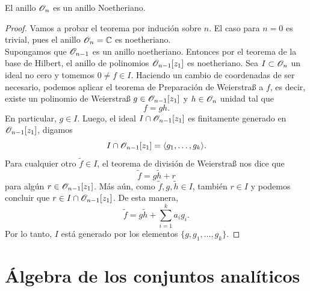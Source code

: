\begin{theorem}\label{anillonoetheriano}
	El anillo $\mathscr{O}_{n}$ es un anillo Noetheriano.
\end{theorem}
\begin{proof}
	Vamos a probar el teorema por indución sobre $n$. El caso para $n=0$ es trivial, pues el anillo $\mathscr{O}_n=\mathbb{C}$ es noetheriano.\\
	Supongamos que $\mathscr{O}_{n-1}$ es un anillo noetheriano. Entonces por el teorema de la base de Hilbert, el anillo de polinomios $\mathscr{O}_{n-1}[z_1]$ es noetheriano. Sea $I\subset\mathscr{O}_n$ un ideal no cero y tomemos $0\neq f\in I$. Haciendo un cambio de coordenadas de ser necesario, podemos aplicar el teorema de Preparación de Weierstraß a $f$, es decir, existe un polinomio de Weierstraß $g\in \mathscr{O}_{n-1}[z_1]$ y $h\in\mathscr{O}_n$ unidad tal que
	\begin{equation*}
		f=gh.
	\end{equation*}
	En particular, $g\in I$. Luego, el ideal $I\cap \mathscr{O}_{n-1}[z_1]$ es finitamente generado en $\mathscr{O}_{n-1}[z_1]$, digamos
	\begin{equation*}
		I\cap \mathscr{O}_{n-1}[z_1]=\langle g_1,\dots,g_k \rangle.
	\end{equation*}
	Para cualquier otro $\tilde{f}\in I$, el teorema de división de Weierstraß nos dice que 
	\begin{equation*}
		\tilde{f}=g\tilde{h}+r
	\end{equation*}
	para algún $r\in\mathscr{O}_{n-1}[z_1]$. Más aún, como $\tilde{f},g,\tilde{h}\in I$, también $r\in I$ y podemos concluir que $r\in I\cap \mathscr{O}_{n-1}[z_1]$. De esta manera,
	\begin{equation*}
		\tilde{f}=g\tilde{h}+\sum_{i=1}^{k}a_ig_i.
	\end{equation*}
	Por lo tanto, $I$ está generado por los elementos $\{g,g_1,\dots,g_k\}$.
\end{proof}


\section{Álgebra de los conjuntos analíticos}


